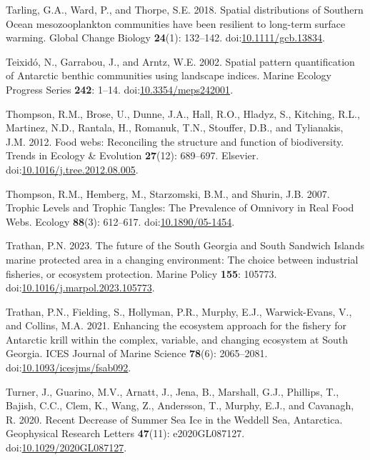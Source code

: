 \documentclass[
]{article}
\newlength{\cslhangindent}
\newenvironment{CSLReferences}[2] %
 {\begin{list}{}{%
  \setlength{\itemindent}{0pt}
  \setlength{\leftmargin}{0pt}
  \setlength{\parsep}{0pt}
  \ifodd #1
   \setlength{\leftmargin}{\cslhangindent}
   \setlength{\itemindent}{-1\cslhangindent}
  \fi
  \setlength{\itemsep}{#2\baselineskip}}}
 {\end{list}}
\begin{document}
\begin{CSLReferences}{1}{0}
Tarling, G.A., Ward, P., and Thorpe, S.E. 2018. Spatial distributions of
{Southern Ocean} mesozooplankton communities have been resilient to
long-term surface warming. Global Change Biology \textbf{24}(1):
132--142.
doi:\href{https://doi.org/10.1111/gcb.13834}{10.1111/gcb.13834}.

Teixidó, N., Garrabou, J., and Arntz, W.E. 2002. Spatial pattern
quantification of {Antarctic} benthic communities using landscape
indices. Marine Ecology Progress Series \textbf{242}: 1--14.
doi:\href{https://doi.org/10.3354/meps242001}{10.3354/meps242001}.

Thompson, R.M., Brose, U., Dunne, J.A., Hall, R.O., Hladyz, S.,
Kitching, R.L., Martinez, N.D., Rantala, H., Romanuk, T.N., Stouffer,
D.B., and Tylianakis, J.M. 2012. Food webs: Reconciling the structure
and function of biodiversity. Trends in Ecology \& Evolution
\textbf{27}(12): 689--697. Elsevier.
doi:\href{https://doi.org/10.1016/j.tree.2012.08.005}{10.1016/j.tree.2012.08.005}.

Thompson, R.M., Hemberg, M., Starzomski, B.M., and Shurin, J.B. 2007.
Trophic {Levels} and {Trophic Tangles}: {The Prevalence} of {Omnivory}
in {Real Food Webs}. Ecology \textbf{88}(3): 612--617.
doi:\href{https://doi.org/10.1890/05-1454}{10.1890/05-1454}.

Trathan, P.N. 2023. The future of the {South Georgia} and {South
Sandwich Islands} marine protected area in a changing environment: {The}
choice between industrial fisheries, or ecosystem protection. Marine
Policy \textbf{155}: 105773.
doi:\href{https://doi.org/10.1016/j.marpol.2023.105773}{10.1016/j.marpol.2023.105773}.

Trathan, P.N., Fielding, S., Hollyman, P.R., Murphy, E.J.,
Warwick-Evans, V., and Collins, M.A. 2021. Enhancing the ecosystem
approach for the fishery for {Antarctic} krill within the complex,
variable, and changing ecosystem at {South Georgia}. ICES Journal of
Marine Science \textbf{78}(6): 2065--2081.
doi:\href{https://doi.org/10.1093/icesjms/fsab092}{10.1093/icesjms/fsab092}.

Turner, J., Guarino, M.V., Arnatt, J., Jena, B., Marshall, G.J.,
Phillips, T., Bajish, C.C., Clem, K., Wang, Z., Andersson, T., Murphy,
E.J., and Cavanagh, R. 2020. Recent {Decrease} of {Summer Sea Ice} in
the {Weddell Sea}, {Antarctica}. Geophysical Research Letters
\textbf{47}(11): e2020GL087127.
doi:\href{https://doi.org/10.1029/2020GL087127}{10.1029/2020GL087127}.


\end{CSLReferences}
\end{document}

